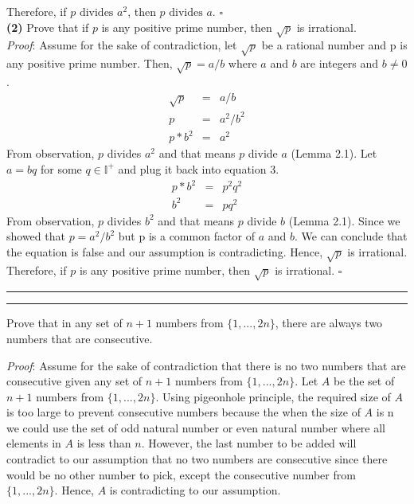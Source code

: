 \documentclass[a4paper, 11pt]{article}
\newcommand{\question}[2] {\vspace{.25in} \hrule\vspace{0.5em}
	\noindent{\bf #1: #2} \vspace{0.5em}
	\hrule \vspace{.10in}}
\renewcommand{\part}[1] {\vspace{.10in} {\bf (#1)}}
\begin{document}
	Therefore, if $p  \text{ divides } a^2$, then $p \text{ divides } a$. $\square$ \\
	
	\part{2} Prove that if $p$ is any positive prime number, then $\sqrt{p}$ is irrational.\\
	
	{\em Proof}: Assume for the sake of contradiction, let $\sqrt{p}$ be a rational number and p is any positive prime number. Then, $\sqrt{p}=a/b$ where $a$ and $b$ are integers and $b \neq 0$.
	\begin{eqnarray}
	\sqrt{p}&=&a/b\\
	p&=&a^2/b^2\\
	p*b^2&=&a^2
	\end{eqnarray}
	From observation, $p$ divides $a^2$ and that means $p$ divide $a$ (Lemma 2.1).
	Let $a = bq$ for some $q \in \mathbb{I^+}$ and plug it back into equation 3.
	\begin{eqnarray}
	p*b^2&=&p^2q^2\\
	b^2&=&pq^2
	\end{eqnarray}
	From observation, $p$ divides $b^2$ and that means $p$ divide $b$ (Lemma 2.1).
	Since we showed that $	p=a^2/b^2 $ but p is a common factor of $a$ and $b$. We can
	conclude that the equation is false and our assumption is contradicting.
	Hence, $\sqrt{p}$ is irrational.
	Therefore, if $p$ is any positive prime number, then $\sqrt{p}$ is irrational. $\square$
	
	\question{3}{Spacing}
	
	Prove that in any set of $n +1$ numbers from $\{1, . . . , 2n\}$, there are always two numbers that are consecutive.
	
	{\em Proof}: Assume for the sake of contradiction that there is no two numbers that are consecutive given any set of $n +1$ numbers from $\{1, . . . , 2n\}$. Let $A$ be the set of $n +1$ numbers from $\{1, . . . , 2n\}$. Using pigeonhole principle, the required size of $A$ is too large to prevent consecutive numbers because the when the size of $A$ is n we could use the set of odd natural number or even natural number where all elements in $A$ is less than $n$. However, the last number to be added will contradict to our assumption that no two numbers are consecutive since there would be no other number to pick, except the consecutive number from $\{1, . . . , 2n\}$. Hence, $A$ is contradicting to our assumption.
	
\end{document}
